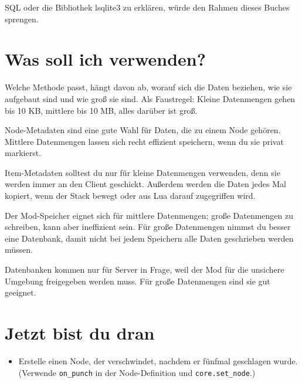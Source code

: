SQL oder die Bibliothek lsqlite3 zu erklären, würde den Rahmen dieses
Buches sprengen.

\section{Was soll ich verwenden?}\label{was-soll-ich-verwenden}

Welche Methode passt, hängt davon ab, worauf sich die Daten beziehen,
wie sie aufgebaut sind und wie groß sie sind. Als Faustregel: Kleine
Datenmengen gehen bis 10 KB, mittlere bis 10 MB, alles darüber ist groß.

Node-Metadaten sind eine gute Wahl für Daten, die zu einem Node gehören.
Mittlere Datenmengen lassen sich recht effizient speichern, wenn du sie
privat markierst.

Item-Metadaten solltest du nur für kleine Datenmengen verwenden, denn
sie werden immer an den Client geschickt. Außerdem werden die Daten
jedes Mal kopiert, wenn der Stack bewegt oder aus Lua darauf zugegriffen
wird.

Der Mod-Speicher eignet sich für mittlere Datenmengen; große Datenmengen
zu schreiben, kann aber ineffizient sein. Für große Datenmengen nimmst
du besser eine Datenbank, damit nicht bei jedem Speichern alle Daten
geschrieben werden müssen.

Datenbanken kommen nur für Server in Frage, weil der Mod für die
unsichere Umgebung freigegeben werden muss. Für große Datenmengen sind
sie gut geeignet.

\section{Jetzt bist du dran}\label{jetzt-bist-du-dran}

\begin{itemize}
\tightlist
\item
  Erstelle einen Node, der verschwindet, nachdem er fünfmal geschlagen
  wurde. (Verwende
  \texttt{on\_\allowbreak{}punch}
  in der Node-Definition und
  \texttt{core.\allowbreak{}set\_\allowbreak{}node}.)
\end{itemize}
